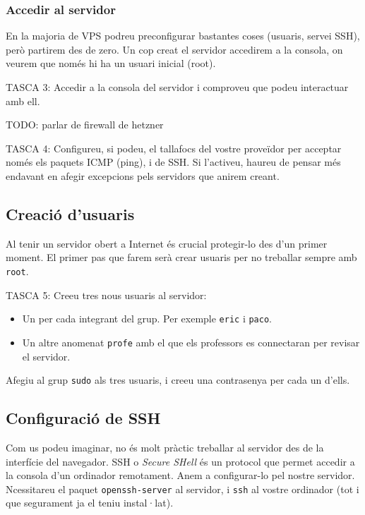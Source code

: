 \documentclass{practicaitic}
\begin{document}
\subsubsection{Accedir al servidor}

En la majoria de VPS podreu preconfigurar bastantes coses (usuaris, servei SSH),
però partirem des de zero. Un cop creat el servidor accedirem a la consola,
on veurem que només hi ha un usuari inicial (root).

TASCA 3: Accedir a la consola del servidor i comproveu que podeu interactuar amb
ell.

TODO: parlar de firewall de hetzner

TASCA 4: Configureu, si podeu, el tallafocs del vostre proveïdor per acceptar només
els paquets ICMP (ping), i de SSH. Si l'activeu, haureu de pensar més endavant en
afegir excepcions pels servidors que anirem creant.

\subsection{Creació d'usuaris}

Al tenir un servidor obert a Internet és crucial protegir-lo des d'un primer
moment. El primer pas que farem serà crear usuaris per no treballar sempre
amb \texttt{root}.

TASCA 5: Creeu tres nous usuaris al servidor:
\begin{itemize}
  \item Un per cada integrant del grup. Per exemple \texttt{eric} i \texttt{paco}.
  \item Un altre anomenat \texttt{profe} amb el que els professors es connectaran
  per revisar el servidor.
\end{itemize}
Afegiu al grup \texttt{sudo} als tres usuaris, i creeu una contrasenya per
cada un d'ells.

\subsection{Configuració de SSH}

Com us podeu imaginar, no és molt pràctic treballar al servidor des de la
interfície del navegador. SSH o \textit{Secure SHell} és un protocol que permet
accedir a la consola d'un ordinador remotament. Anem a configurar-lo pel nostre
servidor. Ncessitareu el paquet \texttt{openssh-server} al servidor, i \texttt{ssh}
al vostre ordinador (tot i que segurament ja el teniu instal·lat).
\end{document}
